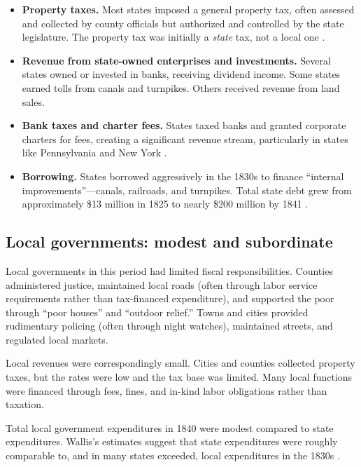 \documentclass[12pt]{article}
\begin{document}
\begin{itemize}
    \item \textbf{Property taxes.}  Most states imposed a general property tax, often assessed and collected by county officials but authorized and controlled by the state legislature.  The property tax was initially a \textit{state} tax, not a local one \citep{wallis2001property}.

    \item \textbf{Revenue from state-owned enterprises and investments.}  Several states owned or invested in banks, receiving dividend income.  Some states earned tolls from canals and turnpikes.  Others received revenue from land sales.

    \item \textbf{Bank taxes and charter fees.}  States taxed banks and granted corporate charters for fees, creating a significant revenue stream, particularly in states like Pennsylvania and New York \citep{sylla_legler_wallis1987}.

    \item \textbf{Borrowing.}  States borrowed aggressively in the 1830s to finance ``internal improvements''---canals, railroads, and turnpikes.  Total state debt grew from approximately \$13 million in 1825 to nearly \$200 million by 1841 \citep{wallis2005constitutions, grinath1997debt}.
\end{itemize}

\subsection{Local governments: modest and subordinate}

Local governments in this period had limited fiscal responsibilities.  Counties administered justice, maintained local roads (often through labor service requirements rather than tax-financed expenditure), and supported the poor through ``poor houses'' and ``outdoor relief.''  Towns and cities provided rudimentary policing (often through night watches), maintained streets, and regulated local markets.

Local revenues were correspondingly small.  Cities and counties collected property taxes, but the rates were low and the tax base was limited.  Many local functions were financed through fees, fines, and in-kind labor obligations rather than taxation.

Total local government expenditures in 1840 were modest compared to state expenditures.  Wallis's estimates suggest that state expenditures were roughly comparable to, and in many states exceeded, local expenditures in the 1830s \citep{wallis2000jep}.
\end{document}
